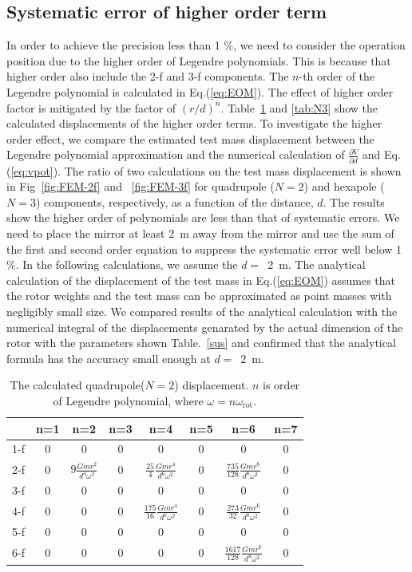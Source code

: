 \documentclass[A4]{spie}  %
\begin{document}
\subsection{Systematic error of higher order term}
In order to achieve the precision less than 1 \%, we need to consider the operation position due to the higher order of Legendre polynomials. This is because that higher order also include the 2-f and 3-f components. The $n$-th order of the Legendre polynomial is calculated in Eq.(\ref{eq:EOM}). The effect of higher order factor is mitigated by the factor of $(r/d)^n$. Table~\ref{tab:N2} and \ref{tab:N3} show the calculated displacements of the higher order terms.
To investigate the higher order effect, we compare the estimated test mass displacement between the Legendre polynomial approximation and the numerical calculation of $\frac{\partial V}{\partial{d}}$ and Eq.(\ref{eq:vpot}). The ratio of two calculations on the test mass displacement is shown in Fig~\ref{fig:FEM-2f} and ~\ref{fig:FEM-3f} for quadrupole ($N=2$) and hexapole ($N=3$) components, respectively, as a function of the distance, $d$.
The results show the higher order of polynomials are less than that of systematic errors. We need to place the mirror at least 2~m away from the mirror and use the sum of the first and second order equation to suppress the systematic error well below 1 \%.
In the following calculations, we assume the $d= $~2~m. 
The analytical calculation of the displacement of the test mass in Eq.(\ref{eq:EOM}) assumes that the rotor weights and the test mass can be approximated as point masses with negligibly small size.
We compared results of the analytical calculation with the numerical integral of the displacements genarated by the actual dimension of the rotor 
with the parameters shown Table.~\ref{sus} and confirmed that the analytical formula has the accuracy small enough at $d= $~2~m.

\begin{table}
\begin{center}
\caption{The calculated quadrupole($N=2$) displacement. $n$ is order of Legendre polynomial, where $\omega=n\omega_{\mathrm{rot}}$. \label{tab:N2}}
\footnotesize
\begin{tabular}{cccccccc}
\hline
& n=1 & n=2& n=3 &n=4&n=5&n=6&n=7 \\
\hline
1-f&0&0&0&0&0&0&0 \\
2-f&0&$9 \frac{Gmr^2}{d^4\omega^2}$&0&$\frac{25}{4} \frac{Gmr^4}{d^6\omega^2}$&0&$\frac{735}{128} \frac{Gmr^6}{d^8\omega^2}$&0  \\
3-f&0&0&0&0&0&0&0\\
4-f&0&0&0&$\frac{175}{16} \frac{Gmr^4}{d^6\omega^2}$&0& $\frac{273}{32} \frac{Gmr^6}{d^8\omega^2}$&0 \\
5-f&0&0&0&0&0&0&0 \\
6-f&0&0&0&0&0&$\frac{1617}{128} \frac{Gmr^6}{d^8\omega^2}$&0  \\
\hline
\end{tabular}
\end{center}
\end{table}
\end{document}
